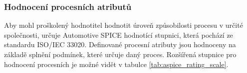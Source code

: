 \documentclass[czech,master,public,dept460,male,cpdeclaration,oneside]{diploma}
\begin{document}
\subsubsection{Hodnocení procesních atributů}
\label{sec:process_atributes}
Aby mohl proškolený hodnotitel hodnotit úroveň způsobilosti procesu v určité společnosti, určuje Automotive SPICE hodnotící stupnici, která pochází ze standardu ISO/IEC 33020. Definované procesní atributy jsou hodnoceny na základě splnění podmínek, které určuje daný proces. Rozšířená stupnice pro hodnocení procesních je možné vidět v tabulce \ref{tab:aspice_rating_scale}.


\begin{table}[htp]
\begin{center}
\begin{tabular}{c | c | c | m{6cm}}


\end{tabular}
\end{center}
\end{table}
\end{document}
